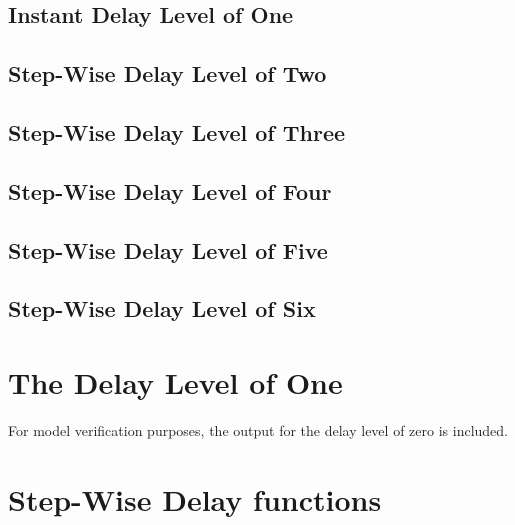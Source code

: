 \subsection{Instant Delay Level of One}

\subsection{Step-Wise Delay Level of Two}

\subsection{Step-Wise Delay Level of Three}

\subsection{Step-Wise Delay Level of Four}

\subsection{Step-Wise Delay Level of Five}

\subsection{Step-Wise Delay Level of Six}



\section{The Delay Level of One}
For model verification purposes, the output for the delay level of zero is included.

\begin{small}
     \tcbox[size=normal, standard jigsaw, opacityback=0, boxrule=0pt,halign=justify]{
     Comment on the figure for Instant delay of One}{
          \begin{itemize}
         \item   
         \item  
          \end{itemize} 

\end{small}






\section{Step-Wise Delay functions}













